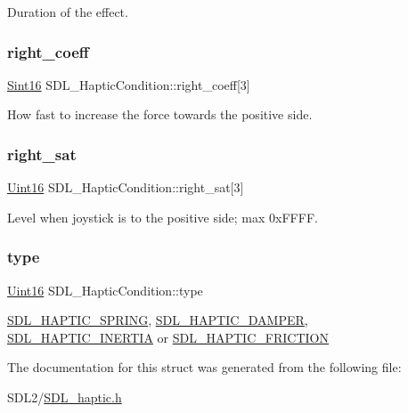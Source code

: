 Duration of the effect. \mbox{\label{struct_s_d_l___haptic_condition_a3de7f164ef88841255535387d0f100b6}} 
\subsubsection{\texorpdfstring{right\+\_\+coeff}{right\_coeff}}
{\footnotesize\ttfamily \hyperlink{_s_d_l__stdinc_8h_a9d0257032c0e146ab6121bf0122712f5}{Sint16} S\+D\+L\+\_\+\+Haptic\+Condition\+::right\+\_\+coeff\mbox{[}3\mbox{]}}

How fast to increase the force towards the positive side. \mbox{\label{struct_s_d_l___haptic_condition_a90427a1e0d464b4b53abc1d419c97b2e}} 
\subsubsection{\texorpdfstring{right\+\_\+sat}{right\_sat}}
{\footnotesize\ttfamily \hyperlink{_s_d_l__stdinc_8h_a31fcc0a076c9068668173ee26d33e42b}{Uint16} S\+D\+L\+\_\+\+Haptic\+Condition\+::right\+\_\+sat\mbox{[}3\mbox{]}}

Level when joystick is to the positive side; max 0x\+F\+F\+FF. \mbox{\label{struct_s_d_l___haptic_condition_a7be55a9a86c05dd1a54a3006781cfa6f}} 
\subsubsection{\texorpdfstring{type}{type}}
{\footnotesize\ttfamily \hyperlink{_s_d_l__stdinc_8h_a31fcc0a076c9068668173ee26d33e42b}{Uint16} S\+D\+L\+\_\+\+Haptic\+Condition\+::type}

\hyperlink{_s_d_l__haptic_8h_a3b52d4700380085e2b5d87bb20320fb1}{S\+D\+L\+\_\+\+H\+A\+P\+T\+I\+C\+\_\+\+S\+P\+R\+I\+NG}, \hyperlink{_s_d_l__haptic_8h_a69522f261973e3ea4273486141320a87}{S\+D\+L\+\_\+\+H\+A\+P\+T\+I\+C\+\_\+\+D\+A\+M\+P\+ER}, \hyperlink{_s_d_l__haptic_8h_a14b807471589120395aec28293cf6642}{S\+D\+L\+\_\+\+H\+A\+P\+T\+I\+C\+\_\+\+I\+N\+E\+R\+T\+IA} or \hyperlink{_s_d_l__haptic_8h_a98a5011311168d63921aaac21403a4d8}{S\+D\+L\+\_\+\+H\+A\+P\+T\+I\+C\+\_\+\+F\+R\+I\+C\+T\+I\+ON} 

The documentation for this struct was generated from the following file\+:\begin{DoxyCompactItemize}
\item 
S\+D\+L2/\hyperlink{_s_d_l__haptic_8h}{S\+D\+L\+\_\+haptic.\+h}\end{DoxyCompactItemize}

